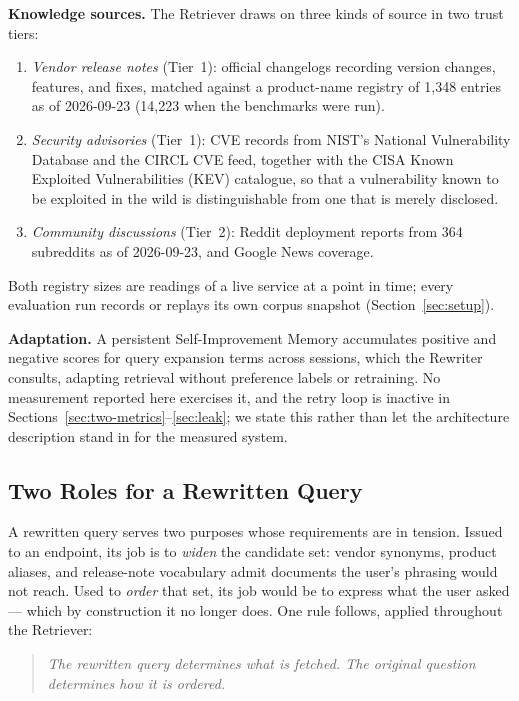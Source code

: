 \documentclass[10pt,conference]{IEEEtran}
\begin{document}
\textbf{Knowledge sources.} The Retriever draws on three kinds of source in two
trust tiers:
\begin{enumerate}
\item \emph{Vendor release notes} (Tier~1): official changelogs recording
  version changes, features, and fixes, matched against a product-name registry
  of 1{,}348 entries as of 2026-09-23 (14{,}223 when the benchmarks were run).
\item \emph{Security advisories} (Tier~1): CVE records from NIST's National
  Vulnerability Database and the CIRCL CVE feed, together with the CISA Known
  Exploited Vulnerabilities (KEV) catalogue, so that a vulnerability known to be
  exploited in the wild is distinguishable from one that is merely disclosed.
\item \emph{Community discussions} (Tier~2): Reddit deployment reports from 364
  subreddits as of 2026-09-23, and Google News coverage.
\end{enumerate}
Both registry sizes are readings of a live service at a point in time; every
evaluation run records or replays its own corpus snapshot
(Section~\ref{sec:setup}).

\textbf{Adaptation.} A persistent Self-Improvement Memory accumulates positive and
negative scores for query expansion terms across sessions, which the Rewriter
consults, adapting retrieval without preference labels or retraining. No
measurement reported here exercises it, and the retry loop is inactive in
Sections~\ref{sec:two-metrics}--\ref{sec:leak}; we state this rather than let the
architecture description stand in for the measured system.

\subsection{Two Roles for a Rewritten Query}

A rewritten query serves two purposes whose requirements are in tension. Issued to
an endpoint, its job is to \emph{widen} the candidate set: vendor synonyms, product
aliases, and release-note vocabulary admit documents the user's phrasing would not
reach. Used to \emph{order} that set, its job would be to express what the user
asked --- which by construction it no longer does. One rule follows, applied
throughout the Retriever:

\begin{quote}
\emph{The rewritten query determines what is fetched. The original question
determines how it is ordered.}
\end{quote}
\end{document}
